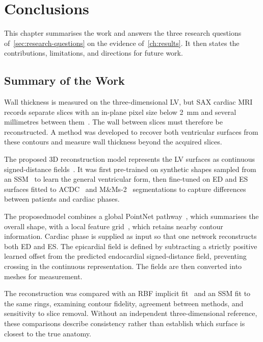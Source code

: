 \chapter{Conclusions}
\label{ch:conclusions}

\noindent
This chapter summarises the work and answers the three research questions
of~\cref{sec:research-questions} on the evidence of~\cref{ch:results}.
It then states the contributions, limitations, and directions for future work.

\section{Summary of the Work}
\label{sec:conclusion-summary}
\noindent
Wall thickness is measured on the three-dimensional LV, but SAX cardiac MRI
records separate slices with an in-plane pixel size below 2~mm and several
millimetres between them~\parencite{bernard2018acdc,kramer2020cmrprotocols}.
The wall between slices must therefore be reconstructed. A method was developed
to recover both ventricular surfaces from these contours and measure wall
thickness beyond the acquired slices.

The proposed 3D reconstruction model represents the LV surfaces as continuous
signed-distance fields~\parencite{deepsdf2019}. It was first pre-trained on
synthetic shapes sampled from an SSM~\parencite{bai2015biventricularatlas}
to learn the general ventricular form, then fine-tuned on ED and ES surfaces
fitted to ACDC~\parencite{bernard2018acdc} and
M\&Ms-2~\parencite{martinisla2023mnms2} segmentations to capture differences
between patients and cardiac phases.

The proposedmodel combines a global PointNet pathway~\parencite{qi2017pointnet},
which summarises the overall shape, with a local feature
grid~\parencite{peng2020convonet}, which retains nearby contour information.
Cardiac phase is supplied as input so that one network reconstructs both ED
and ES. The epicardial field is defined by subtracting a strictly positive
learned offset from the predicted endocardial signed-distance field, preventing
crossing in the continuous representation. The fields are then converted into
meshes for measurement.

The reconstruction was compared with an RBF implicit
fit~\parencite{carr2001rbf} and an SSM fit to the same rings, examining contour
fidelity, agreement between methods, and sensitivity to slice removal. Without
an independent three-dimensional reference, these comparisons describe
consistency rather than establish which surface is closest to the true anatomy.

